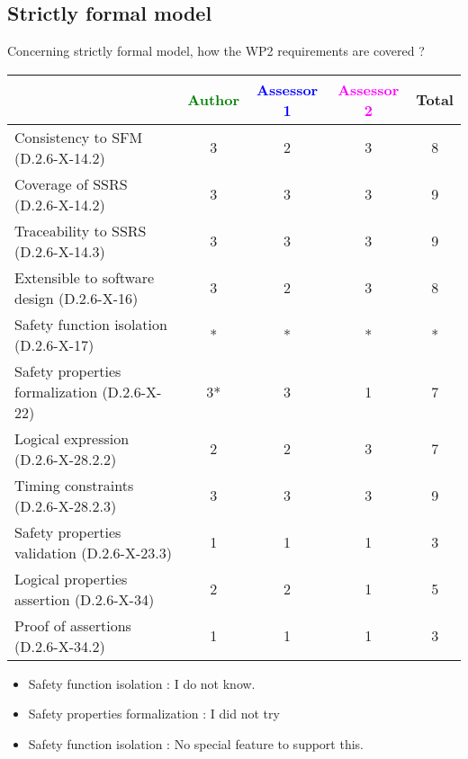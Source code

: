 \subsection{Strictly formal model}

Concerning strictly formal model, how the WP2 requirements are covered ?

\begin{tabular}{|l | c | c | c | c|}
\hline
& \textcolor{green}{Author} & \textcolor{blue}{Assessor 1} & \textcolor{magenta}{Assessor 2} & Total \\
\hline 
Consistency to SFM (D.2.6-X-14.2) &3 & 2& 3 & 8 \\
\hline
Coverage of SSRS (D.2.6-X-14.2)  & 3& 3& 3& 9 \\
\hline
Traceability to  SSRS (D.2.6-X-14.3)  & 3& 3& 3& 9 \\
\hline
Extensible to software design (D.2.6-X-16)  &3 & 2& 3& 8  \\
\hline
Safety function isolation (D.2.6-X-17)  & *  & * & * & * \\
\hline 
Safety properties formalization (D.2.6-X-22)  &3* & 3 & 1 & 7 \\
\hline
Logical expression (D.2.6-X-28.2.2)  &2 & 2& 3 & 7  \\
\hline
Timing constraints (D.2.6-X-28.2.3)  &3 & 3& 3& 9 \\
\hline
Safety properties validation (D.2.6-X-23.3)  &1 & 1& 1&  3 \\
\hline
Logical properties assertion (D.2.6-X-34)  &2 & 2& 1& 5 \\
\hline
Proof of assertions (D.2.6-X-34.2)  &1 & 1& 1& 3 \\
\hline
\end{tabular}

\begin{author_comment}
\begin{itemize}
\item Safety function isolation :  I do not know.
\item Safety properties formalization : I did not try
\end{itemize}

\end{author_comment}

\begin{assessor1}
\begin{itemize}
\item Safety function isolation :  No special feature to support this.
\end{itemize}

\end{assessor1}

